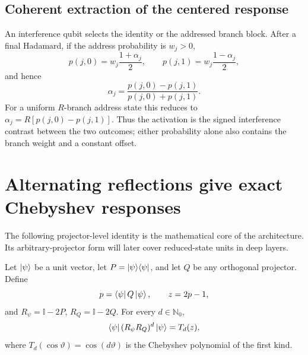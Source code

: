 \documentclass[pdflatex,sn-mathphys,NameDate,iicol]{sn-jnl}
\newcommand{\id}{\mathbb{I}}
\newcommand{\N}{\mathbb{N}}
\newcommand{\proj}[1]{\ket{#1}\!\bra{#1}}
\begin{document}
\subsection{Coherent extraction of the centered response}

An interference qubit selects the identity or the addressed branch block.
After a final Hadamard, if the address probability is $w_j>0$,
\begin{equation}
  p(j,0)=w_j\frac{1+\alpha_j}{2},
  \qquad
  p(j,1)=w_j\frac{1-\alpha_j}{2},
  \label{eq:conditional-probs}
\end{equation}
and hence
\begin{equation}
  \alpha_j
  =
  \frac{p(j,0)-p(j,1)}{p(j,0)+p(j,1)}.
  \label{eq:centered-extraction}
\end{equation}
For a uniform $R$-branch address state this reduces to
$\alpha_j=R[p(j,0)-p(j,1)]$. Thus the activation is the signed interference
contrast between the two outcomes; either probability alone also contains the
branch weight and a constant offset.

\section{Alternating reflections give exact Chebyshev responses}
\label{sec:reflection-theorem}

The following projector-level identity is the mathematical core of the
architecture. Its arbitrary-projector form will later cover reduced-state
units in deep layers.

\begin{theorem}
\label{thm:reflection-chebyshev}
Let $\ket\psi$ be a unit vector, let $P=\proj\psi$, and let $Q$ be any
orthogonal projector. Define
\begin{equation}
  p=\bra\psi Q\ket\psi,
  \qquad
  z=2p-1,
\end{equation}
and $R_\psi=\id-2P$, $R_Q=\id-2Q$. For every $d\in\N_0$,
\begin{equation}
  \bra\psi(R_\psi R_Q)^d\ket\psi=T_d(z),
  \label{eq:chebyshev-identity}
\end{equation}
where $T_d(\cos\vartheta)=\cos(d\vartheta)$ is the Chebyshev polynomial of
the first kind.
\end{theorem}
\end{document}
